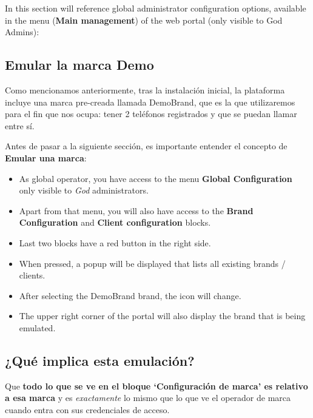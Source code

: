\documentclass[letterpaper,10pt,spanish]{sphinxmanual}
\begin{document}
In this section will reference global administrator configuration options,
available in the menu (\textbf{Main management}) of the web portal (only visible to
God Admins):


\subsection{Emular la marca Demo}
\label{getting_started/internal_calls/god_portal:emulate-the-demo-brand}
Como mencionamos anteriormente, tras la instalación inicial, la plataforma incluye una marca pre-creada llamada DemoBrand, que es la que utilizaremos para el fin que nos ocupa: tener 2 teléfonos registrados y que se puedan llamar entre sí.

Antes de pasar a la siguiente sección, es importante entender el concepto de \textbf{Emular una marca}:
\begin{itemize}
\item {} 
As global operator, you have access to the menu \textbf{Global Configuration} only
visible to \emph{God} administrators.

\item {} 
Apart from that menu, you will also have access to the \textbf{Brand Configuration}
and \textbf{Client configuration} blocks.

\item {} 
Last two blocks have a red button in the right side.

\item {} 
When pressed, a popup will be displayed that lists all existing brands / clients.

\item {} 
After selecting the DemoBrand brand, the icon will change.

\item {} 
The upper right corner of the portal will also display the brand that is being
emulated.

\end{itemize}


\subsection{¿Qué implica esta emulación?}
\label{getting_started/internal_calls/god_portal:what-emulation-means}
Que \textbf{todo lo que se ve en el bloque `Configuración de marca' es relativo a esa marca} y es \emph{exactamente} lo mismo que lo que ve el operador de marca cuando entra con sus credenciales de acceso.
\end{document}
